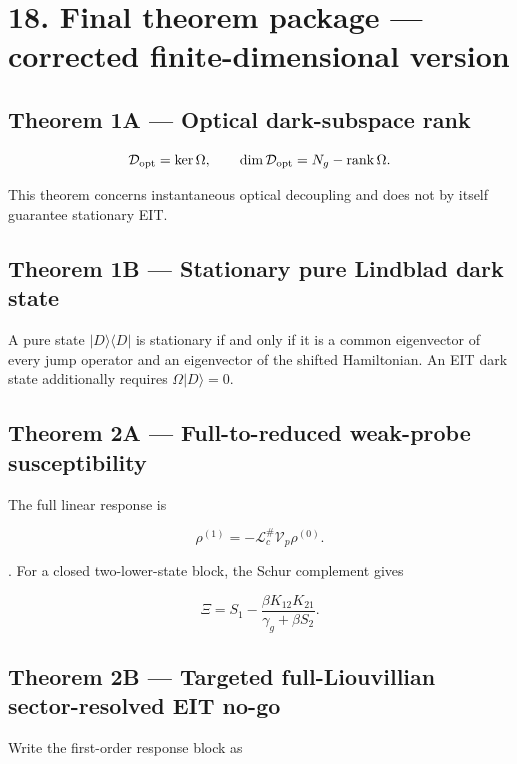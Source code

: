 \documentclass[
  10pt,
  a4paper,
]{article}
\begin{document}
\section{18. Final theorem package --- corrected finite-dimensional
version}\label{final-theorem-package-corrected-finite-dimensional-version}

\subsection{Theorem 1A --- Optical dark-subspace
rank}\label{theorem-1a-optical-dark-subspace-rank-1}

\[
\mathcal D_{\rm opt}=\ker\Omega,
\qquad
\dim\mathcal D_{\rm opt}
=N_g-\operatorname{rank}\Omega.
\]

This theorem concerns instantaneous optical decoupling and does not by
itself guarantee stationary EIT.

\subsection{Theorem 1B --- Stationary pure Lindblad dark
state}\label{theorem-1b-stationary-pure-lindblad-dark-state}

A pure state \(|D\rangle\langle D|\) is stationary if and only if it is
a common eigenvector of every jump operator and an eigenvector of the
shifted Hamiltonian. An EIT dark state additionally requires
\(\Omega|D\rangle=0\).

\subsection{Theorem 2A --- Full-to-reduced weak-probe
susceptibility}\label{theorem-2a-full-to-reduced-weak-probe-susceptibility}

The full linear response is

\[
\rho^{(1)}
=-\mathcal L_c^\#\mathcal V_p\rho^{(0)}.
\]

. For a closed two-lower-state block, the Schur complement gives

\[
\Xi=S_1-
\frac{\beta K_{12}K_{21}}
{\gamma_g+\beta S_2}.
\]

\subsection{Theorem 2B --- Targeted full-Liouvillian sector-resolved EIT
no-go}\label{theorem-2b-targeted-full-liouvillian-sector-resolved-eit-no-go-1}

Write the first-order response block as
\end{document}
